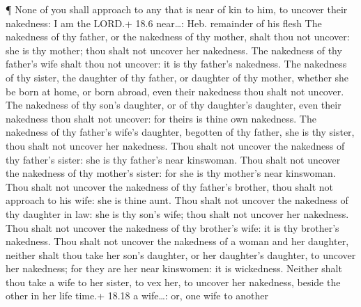  ¶ None of you shall approach to any that is near of kin to
him, to uncover their nakedness: I am the LORD.+ 18.6 near\ldots: Heb.
remainder of his flesh  The nakedness of thy father, or the
nakedness of thy mother, shalt thou not uncover: she is thy mother; thou
shalt not uncover her nakedness.  The nakedness of thy
father's wife shalt thou not uncover: it is thy father's nakedness.
 The nakedness of thy sister, the daughter of thy father, or
daughter of thy mother, whether she be born at home, or born abroad,
even their nakedness thou shalt not uncover.  The nakedness
of thy son's daughter, or of thy daughter's daughter, even their
nakedness thou shalt not uncover: for theirs is thine own nakedness.
 The nakedness of thy father's wife's daughter, begotten of
thy father, she is thy sister, thou shalt not uncover her nakedness.
 Thou shalt not uncover the nakedness of thy father's
sister: she is thy father's near kinswoman.  Thou shalt not
uncover the nakedness of thy mother's sister: for she is thy mother's
near kinswoman.  Thou shalt not uncover the nakedness of
thy father's brother, thou shalt not approach to his wife: she is thine
aunt.  Thou shalt not uncover the nakedness of thy daughter
in law: she is thy son's wife; thou shalt not uncover her nakedness.
 Thou shalt not uncover the nakedness of thy brother's
wife: it is thy brother's nakedness.  Thou shalt not
uncover the nakedness of a woman and her daughter, neither shalt thou
take her son's daughter, or her daughter's daughter, to uncover her
nakedness; for they are her near kinswomen: it is wickedness.
 Neither shalt thou take a wife to her sister, to vex her,
to uncover her nakedness, beside the other in her life time.+ 18.18 a
wife\ldots: or, one wife to another

